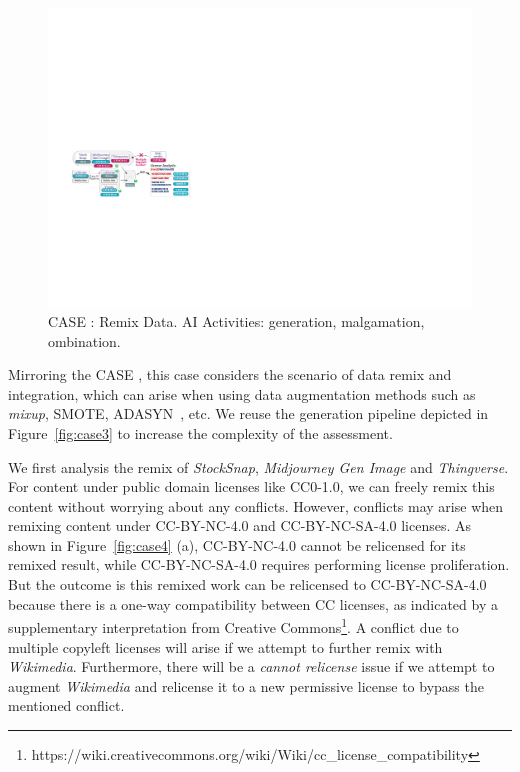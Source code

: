 \begin{figure}[h]
    \centering
    \includegraphics[width=\linewidth]{fig/case5.pdf}
    \caption{CASE : Remix Data. AI Activities: generation, malgamation, ombination.}
    \Description{}
    \label{fig:case5}
\end{figure}

Mirroring the CASE , this case considers the scenario of data remix and integration, which can arise when using data augmentation methods such as \textit{mixup}\cite{zhang2018mixup}, SMOTE\cite{chawla2002smote}, ADASYN~\cite{he2008adasyn}, etc.
We reuse the generation pipeline depicted in Figure~\ref{fig:case3} to increase the complexity of the assessment.

We first analysis the remix of \textit{StockSnap}, \textit{Midjourney Gen Image} and \textit{Thingverse}.
For content under public domain licenses like CC0-1.0, we can freely remix this content without worrying about any conflicts.
However, conflicts may arise when remixing content under CC-BY-NC-4.0 and CC-BY-NC-SA-4.0 licenses.
As shown in Figure~\ref{fig:case4} (a), CC-BY-NC-4.0 cannot be relicensed for its remixed result, while CC-BY-NC-SA-4.0 requires performing license proliferation.
But the outcome is this remixed work can be relicensed to CC-BY-NC-SA-4.0 because there is a one-way compatibility between CC licenses, as indicated by a supplementary interpretation from Creative Commons\footnote{https://wiki.creativecommons.org/wiki/Wiki/cc\_license\_compatibility}.
A conflict due to multiple copyleft licenses will arise if we attempt to further remix with \textit{Wikimedia}.
Furthermore, there will be a \textit{cannot relicense} issue if we attempt to augment \textit{Wikimedia} and relicense it to a new permissive license to bypass the mentioned conflict.

